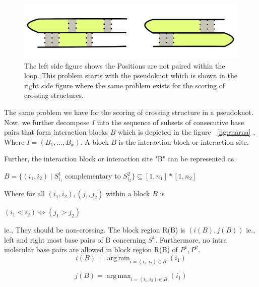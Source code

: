 \documentclass[twoside,a4paper]{report}
\DeclareMathOperator*{\argmin}{arg\,min}
\DeclareMathOperator*{\argmax}{arg\,max}
\begin{document}
 		\begin{figure}[tb]
 		\includegraphics[width=1.0\linewidth]{pseudoknot.pdf}
 		\centering
 		\caption{ The left side figure shows the Positions are not paired within the loop. This problem starts with the pseudoknot which is shown in the right side figure where the same problem exists for the scoring of crossing structures. }
 		\label{fig:pseudoknot}
 	\end{figure}
 	
 	The same problem we have for the scoring of crossing structure in a pseudoknot.\\
 	Now, we further decompose $I$ into the sequence of subsets of consecutive base pairs that form interaction blocks $B$ which is depicted in the figure ~\ref{fig:rnarna} , Where $ I = (B_1 ,..., B_x)$. A block $B$ is the interaction block or interaction site.
 
 	Further, the interaction block or interaction site "B" can be represented as,
 	
 	\begin{center}
 	 $B = \{ (i_1 , i_2)  \mid  S^1_{i_1}$ complementary to $ S^2_{i_2} \} \subseteq [ 1, n_1] * [1 , n_2] $
 	\end{center}
 	
 	Where for all $(i_1 ,i_2) ,(j_1, j_2) $ within a block $B$ is 
 	
 	\begin{center}
 		$(i_1 < i_2) \iff  (j_1 > j_2)$
 	\end{center}
 	
 	ie., They should be non-crossing.  The block region R(B) is $(i(B) , j(B))$ ie., left and right most base pairs of B concerning $S^1$. Furthermore, no intra molecular base pairs are allowed in block region R(B) of $P^1 , P^2$.\\
 	
 	\begin{equation*}
 		i(B) = \argmin_{i = (i_1, i_2 ) \in B } (i_1)
 	\end{equation*}
 
 	\begin{equation*}
 			j(B) = \argmax_{i = (i_1, i_2 ) \in B} (i_1)
 	\end{equation*}
 	
\end{document}
